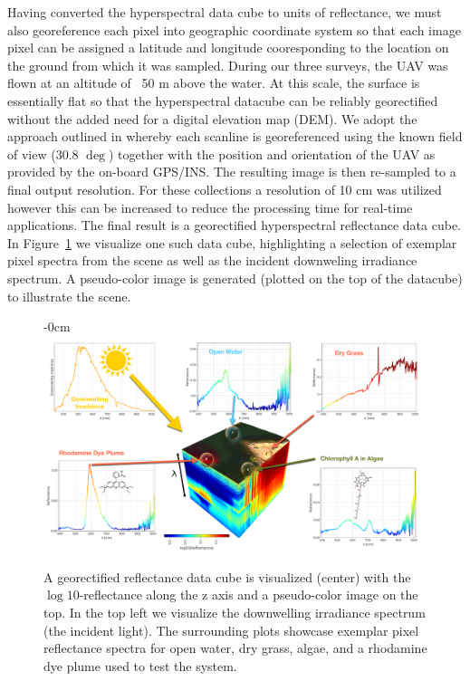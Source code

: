 \documentclass[journal,article,submit,pdftex,moreauthors]{Definitions/mdpi}
\begin{document}
Having converted the hyperspectral data cube to units of reflectance, we must also georeference each pixel into geographic coordinate system so that each image pixel can be assigned a latitude and longitude cooresponding to the location on the ground from which it was sampled. During our three surveys, the UAV was flown at an altitude of ~50 m above the water. At this scale, the surface is essentially flat so that the hyperspectral datacube can be reliably georectified without the added need for a digital elevation map (DEM). We adopt the approach outlined in \cite{GeorectificationMuller, GeorectificationBaumker, GeorectificationMostafa} whereby each scanline is georeferenced using the known field of view (30.8 $\deg$) together with the position and orientation of the UAV as provided by the on-board GPS/INS. The resulting image is then re-sampled to a final output resolution. For these collections a resolution of 10 cm was utilized however this can be increased to reduce the processing time for real-time applications. The final result is a georectified hyperspectral reflectance data cube. In Figure~\ref{fig:hsi-infographic} we visualize one such data cube, highlighting a selection of exemplar pixel spectra from the scene as well as the incident downweling irradiance spectrum. A pseudo-color image is generated (plotted on the top of the datacube) to illustrate the scene.

\begin{figure}[H]
\begin{adjustwidth}{-\extralength}{0cm}
\centering
\includegraphics[width=15.5cm]{paper/figures/materials-and-methods/HyperSpectralInfoGraphic.pdf}
\end{adjustwidth}
\caption{A georectified reflectance data cube is visualized (center) with the $\log10$-reflectance along the z axis and a pseudo-color image on the top. In the top left we visualize the downwelling irradiance spectrum (the incident light). The surrounding plots showcase exemplar pixel reflectance spectra for open water, dry grass, algae, and a rhodamine dye plume used to test the system.\label{fig:hsi-infographic}}
\end{figure}  
\end{document}
